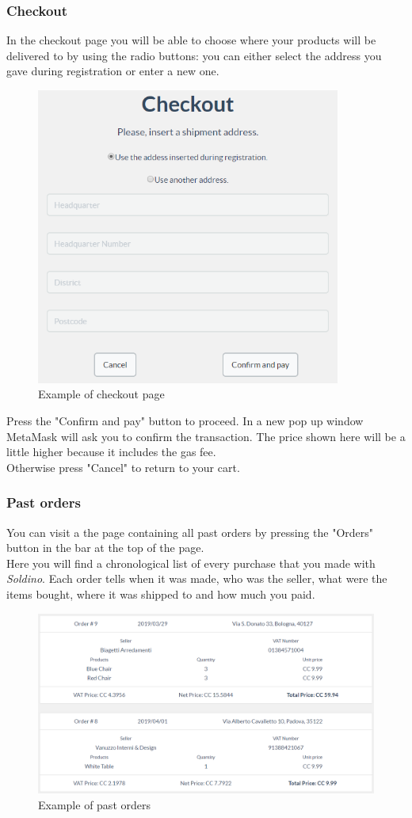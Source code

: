 	\subsubsection{Checkout}
	In the checkout page you will be able to choose where your products will be 
	delivered to by using the radio buttons: you can either select the address you 
	gave during registration or enter a new one.\\
	\begin{figure}[H]
		\includegraphics[width=10cm]{res/images/checkout.png}
		\centering
		\caption{Example of checkout page}
	\end{figure}
	\noindent Press the "Confirm and pay" button to proceed. In a new 
	pop up window MetaMask will ask you to confirm the transaction. The price 
	shown here will be a little higher because it includes the gas fee. \\
	Otherwise press "Cancel" to return to your cart.
	\subsubsection{Past orders}
	You can visit a the page containing all past orders by pressing the "Orders" 
	button in the bar at the top of the page.\\
	Here you will find a chronological list of every purchase that you made with 
	\textit{Soldino}. Each order tells when it was made, who was the seller, 
	what were the items bought, where it was shipped to and how much you paid.
	\begin{figure}[H]
		\includegraphics[width=15cm]{res/images/past_orders.png}
		\centering
		\caption{Example of past orders}
	\end{figure}
